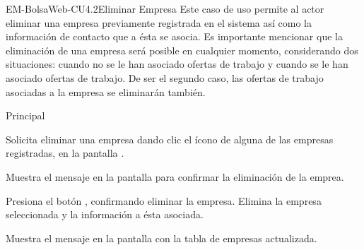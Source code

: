 \begin{UseCase}{EM-BolsaWeb-CU4.2}{Eliminar Empresa}{
		Este caso de uso permite al actor eliminar una empresa previamente registrada en el sistema así como la información de contacto que a ésta se asocia. Es importante mencionar que la eliminación de una empresa será posible en cualquier momento, considerando dos situaciones: cuando no se le han asociado ofertas de trabajo y cuando se le han asociado ofertas de trabajo. De ser el segundo caso, las ofertas de trabajo asociadas a la empresa se eliminarán también. 
	}
\end{UseCase}

\begin{UCtrayectoria}{Principal}

	\UCpaso [\UCactor] Solicita eliminar una empresa dando clic el ícono  de alguna de las empresas registradas, en la pantalla . 

	\UCpaso Muestra el mensaje  en la pantalla  para confirmar la eliminación de la emprea. 

	\UCpaso [\UCactor] Presiona el botón , confirmando eliminar la empresa.  
	\UCpaso Elimina la empresa seleccionada y la información a ésta asociada. 

	\UCpaso Muestra el mensaje  en la pantalla  con la tabla de empresas actualizada. 
\end{UCtrayectoria}

